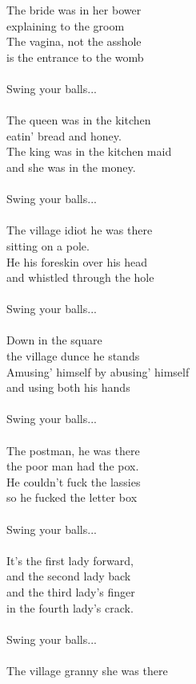 The bride was in her bower\\
explaining to the groom\\
The vagina, not the asshole\\
is the entrance to the womb\\
\\
Swing your balls...\\
\\
The queen was in the kitchen\\
eatin' bread and honey.\\
The king was in the kitchen maid\\
and she was in the money.\\
\\
Swing your balls...\\
\\
The village idiot he was there\\
sitting on a pole.\\
He his foreskin over his head\\
and whistled through the hole\\
\\
Swing your balls...\\
\\
Down in the square\\
the village dunce he stands\\
Amusing' himself by abusing' himself\\
and using both his hands\\
\\
Swing your balls...\\
\\
The postman, he was there\\
the poor man had the pox.\\
He couldn't fuck the lassies\\
so he fucked the letter box\\
\\
Swing your balls...\\
\\
It's the first lady forward,\\
and the second lady back\\
and the third lady's finger\\
in the fourth lady's crack.\\
\\
Swing your balls...\\
\\
The village granny she was there\\
